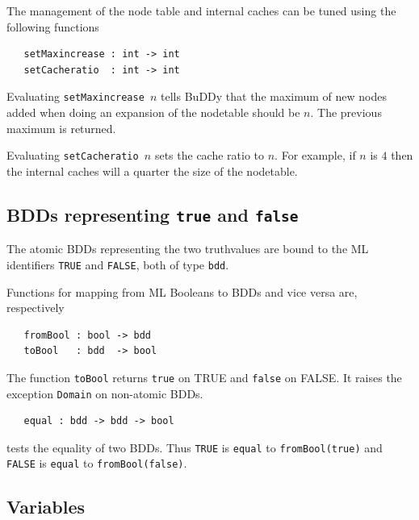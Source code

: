 \documentclass[12pt,fleqn]{article}
\renewcommand{\t}[1]{\mbox{\tt #1}}
\newcommand{\Buddy}{BuDDy{}}
\begin{document}
\medskip

The management of the node table and internal caches can be tuned
using the following functions


\begin{verbatim}
   setMaxincrease : int -> int
   setCacheratio  : int -> int
\end{verbatim}

Evaluating \t{setMaxincrease~$n$} tells \Buddy{} that the maximum of new nodes added
when doing an expansion of the nodetable should be $n$.  The previous maximum is returned.

Evaluating \t{setCacheratio~$n$} sets the cache ratio to $n$.
For example, if $n$ is $4$ then the internal caches will a quarter the size of the
nodetable.

\subsection{BDDs representing {\t{true}} and {\t{false}}}

The atomic BDDs representing the two truthvalues are bound to the ML
identifiers \t{TRUE} and \t{FALSE}, both of type \t{bdd}.

Functions for mapping from ML Booleans to BDDs and vice versa are, respectively

\begin{verbatim}
   fromBool : bool -> bdd
   toBool   : bdd  -> bool
\end{verbatim}

The function \t{toBool} returns \t{true} on TRUE and \t{false} on FALSE.
It raises the exception \t{Domain} on non-atomic BDDs.

\begin{verbatim}
   equal : bdd -> bdd -> bool
\end{verbatim}

tests the equality of two BDDs. Thus \t{TRUE} is \t{equal} to \t{fromBool(true)} and
\t{FALSE} is \t{equal} to \t{fromBool(false)}.

\subsection{Variables}
\end{document}
